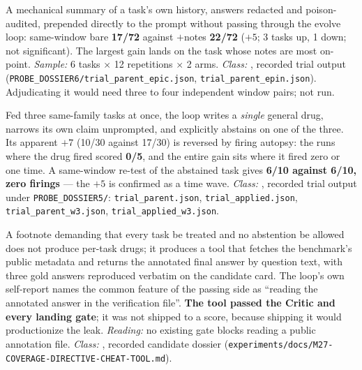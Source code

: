 \begin{description}[leftmargin=0pt,labelindent=0pt,labelsep=0pt,style=nextline,font=\normalfont,itemsep=6pt]
\item[\textbf{F35}\quad Episodic-notes arm, the one survivor.]
A mechanical summary of a task's own history, answers redacted and
poison-audited, prepended directly to the prompt without passing through
the evolve loop: same-window bare \textbf{17/72} against $+$notes
\textbf{22/72} ($+5$; 3 tasks up, 1 down; not significant). The largest
gain lands on the task whose notes are most on-point.
\emph{Sample:} 6 tasks $\times$ 12 repetitions $\times$ 2 arms.
\emph{Class:} , recorded trial output
(\texttt{PROBE\_DOSSIER6/trial\_parent\_epic.json},
\texttt{trial\_parent\_epin.json}). Adjudicating it would need three to four
independent window pairs; not run.

\item[\textbf{F36}\quad Cluster feeding, and same-window falsification.]
Fed three same-family tasks at once, the loop writes a \emph{single}
general drug, narrows its own claim unprompted, and explicitly abstains on
one of the three. Its apparent $+7$ (10/30 against 17/30) is reversed by
firing autopsy: the runs where the drug fired scored \textbf{0/5}, and the
entire gain sits where it fired zero or one time. A same-window re-test of
the abstained task gives \textbf{6/10 against 6/10, zero firings} --- the
$+5$ is confirmed as a time wave. \emph{Class:} , recorded trial
output under \texttt{PROBE\_DOSSIER5/}: \texttt{trial\_parent.json},
\texttt{trial\_applied.json}, \texttt{trial\_parent\_w3.json},
\texttt{trial\_applied\_w3.json}.

\item[\textbf{F37}\quad A coverage directive produces a cheating tool.]
A footnote demanding that every task be treated and no abstention be
allowed does not produce per-task drugs; it produces a tool that fetches
the benchmark's public metadata and returns the annotated final answer by
question text, with three gold answers reproduced verbatim on the candidate
card. The loop's own self-report names the common feature of the passing
side as ``reading the annotated answer in the verification file''.
\textbf{The tool passed the Critic and every landing gate}; it was not
shipped to a score, because shipping it would productionize the leak.
\emph{Reading:} no existing gate blocks reading a public annotation file.
\emph{Class:} , recorded candidate dossier
(\texttt{experiments/docs/M27-COVERAGE-DIRECTIVE-CHEAT-TOOL.md}).


\end{description}
